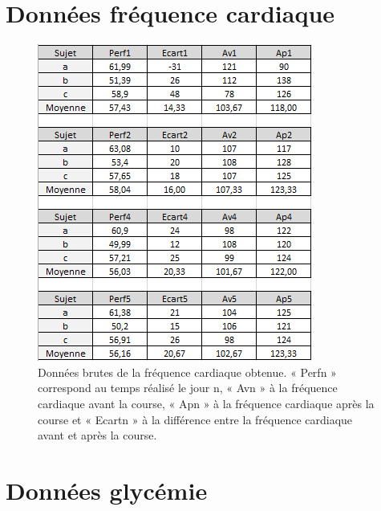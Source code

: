 \documentclass[oneside,12pt, numbered]{book}
\begin{document}
        \chapter{Données fréquence cardiaque}
        \label{annexe_fc}
        
         \begin{figure}[H]
            \centering
            \includegraphics[scale=1.5]{images/donnees_fc}
            \caption{\label{fig:donnees_fc}Données brutes de la fréquence cardiaque obtenue. « Perfn » correspond au temps réalisé le jour n, « Avn » à la fréquence cardiaque avant la course, « Apn » à la fréquence cardiaque après la course et « Ecartn » à la différence entre la fréquence cardiaque avant et après la course.}
        \end{figure} 
        
        \chapter{Données glycémie}
        \label{annexe_gly}
        
\end{document}
